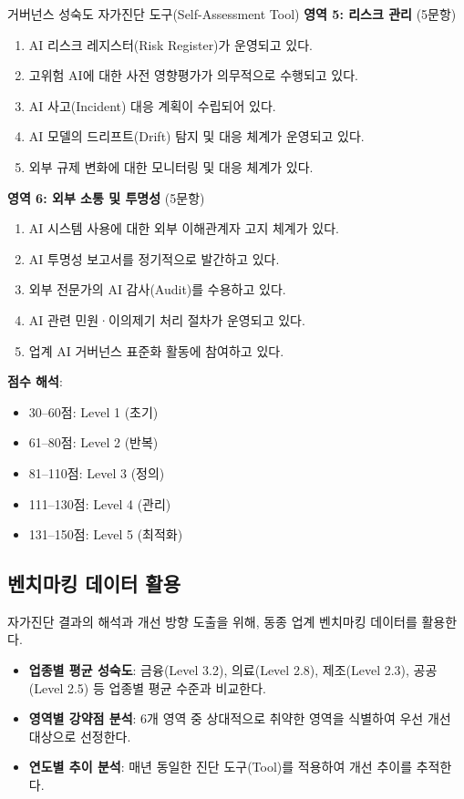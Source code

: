 \begin{practicaltool}{거버넌스 성숙도 자가진단 도구(Self-Assessment Tool)}
\textbf{영역 5: 리스크 관리} (5문항)
\begin{enumerate}
    \item AI 리스크 레지스터(Risk Register)가 운영되고 있다.
    \item 고위험 AI에 대한 사전 영향평가가 의무적으로 수행되고 있다.
    \item AI 사고(Incident) 대응 계획이 수립되어 있다.
    \item AI 모델의 드리프트(Drift) 탐지 및 대응 체계가 운영되고 있다.
    \item 외부 규제 변화에 대한 모니터링 및 대응 체계가 있다.
\end{enumerate}

\textbf{영역 6: 외부 소통 및 투명성} (5문항)
\begin{enumerate}
    \item AI 시스템 사용에 대한 외부 이해관계자 고지 체계가 있다.
    \item AI 투명성 보고서를 정기적으로 발간하고 있다.
    \item 외부 전문가의 AI 감사(Audit)를 수용하고 있다.
    \item AI 관련 민원·이의제기 처리 절차가 운영되고 있다.
    \item 업계 AI 거버넌스 표준화 활동에 참여하고 있다.
\end{enumerate}

\textbf{점수 해석}:
\begin{itemize}
    \item 30--60점: Level 1 (초기)
    \item 61--80점: Level 2 (반복)
    \item 81--110점: Level 3 (정의)
    \item 111--130점: Level 4 (관리)
    \item 131--150점: Level 5 (최적화)
\end{itemize}
\end{practicaltool}

\subsection{벤치마킹 데이터 활용}
\label{sec:8.6.3}

자가진단 결과의 해석과 개선 방향 도출을 위해, 동종 업계 벤치마킹 데이터를 활용한다.

\begin{itemize}
    \item \textbf{업종별 평균 성숙도}: 금융(Level 3.2), 의료(Level 2.8), 제조(Level 2.3), 공공(Level 2.5) 등 업종별 평균 수준과 비교한다.
    \item \textbf{영역별 강약점 분석}: 6개 영역 중 상대적으로 취약한 영역을 식별하여 우선 개선 대상으로 선정한다.
    \item \textbf{연도별 추이 분석}: 매년 동일한 진단 도구(Tool)를 적용하여 개선 추이를 추적한다.
\end{itemize}

